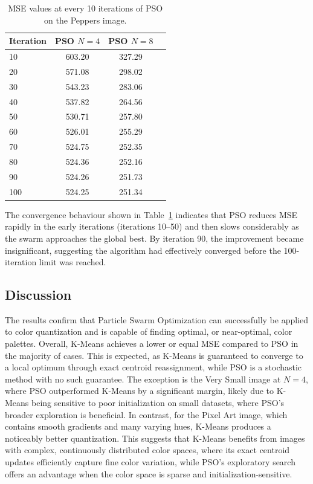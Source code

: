 \documentclass{article}
\begin{document}
\begin{table}[H]
    \centering
    \begin{tabular}{lccc}
        \toprule
        \textbf{Iteration} & \textbf{PSO $N=4$} & \textbf{PSO $N=8$}\\
        \midrule
        10 & 603.20 & 327.29\\
        20 & 571.08 & 298.02\\
        30 & 543.23 & 283.06\\
        40 & 537.82 & 264.56\\
        50 & 530.71 & 257.80\\
        60 & 526.01 & 255.29\\
        70 & 524.75 & 252.35\\
        80 & 524.36 & 252.16\\
        90 & 524.26 & 251.73\\
        100 & 524.25 & 251.34\\
        \bottomrule
    \end{tabular}
    \caption{MSE values at every 10 iterations of PSO on the Peppers image.}
    \label{tab:pso48}
\end{table}
The convergence behaviour shown in Table~\ref{tab:pso48} indicates that PSO reduces MSE rapidly in the early 
iterations (iterations 10–50) and then slows considerably as the swarm approaches the global best. By 
iteration 90, the improvement became insignificant, suggesting the algorithm had effectively converged 
before the 100-iteration limit was reached.


\subsection{Discussion}
The results confirm that Particle Swarm Optimization can successfully be applied to color quantization 
and is capable of finding optimal, or near-optimal, color palettes. Overall, K-Means achieves a lower 
or equal MSE compared to PSO in the majority of cases. This is expected, as K-Means is guaranteed to 
converge to a local optimum through exact centroid reassignment, while PSO is a stochastic method with 
no such guarantee. The exception is the Very Small image at $N=4$, where PSO outperformed K-Means by 
a significant margin, likely due to K-Means being sensitive to poor initialization on small 
datasets, where PSO's broader exploration is beneficial. In contrast, for the Pixel Art image, which 
contains smooth gradients and many varying hues, K-Means produces a noticeably better quantization. 
This suggests that K-Means benefits from images with complex, continuously distributed color spaces, 
where its exact centroid updates efficiently capture fine color variation, while PSO's exploratory 
search offers an advantage when the color space is sparse and initialization-sensitive.
\end{document}
